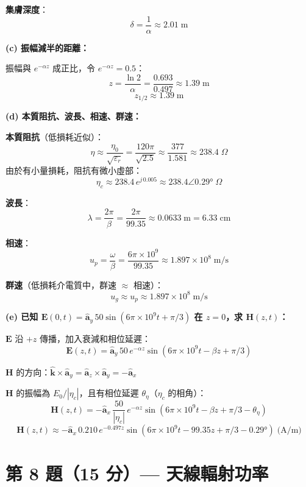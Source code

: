 \documentclass[12pt,a4paper]{article}
\newcommand{\vE}{\mathbf{E}}
\newcommand{\vH}{\mathbf{H}}
\newcommand{\vk}{\mathbf{k}}
\newcommand{\ax}{\hat{\mathbf{a}}_x}
\newcommand{\ay}{\hat{\mathbf{a}}_y}
\newcommand{\az}{\hat{\mathbf{a}}_z}
\begin{document}
\begin{solutionbox}[詳解]
\textbf{集膚深度}：
\[
  \boxed{\delta = \frac{1}{\alpha} \approx 2.01 \;\text{m}}
\]

\textbf{(c) 振幅減半的距離：}

振幅與 $e^{-\alpha z}$ 成正比，令 $e^{-\alpha z} = 0.5$：
\[
  z = \frac{\ln 2}{\alpha} = \frac{0.693}{0.497} \approx 1.39 \;\text{m}
\]
\[
  \boxed{z_{1/2} \approx 1.39 \;\text{m}}
\]

\textbf{(d) 本質阻抗、波長、相速、群速：}

\textbf{本質阻抗}（低損耗近似）：
\[
  \eta \approx \frac{\eta_0}{\sqrt{\varepsilon_r}} = \frac{120\pi}{\sqrt{2.5}} \approx \frac{377}{1.581} \approx 238.4\;\Omega
\]
由於有小量損耗，阻抗有微小虛部：
\[
  \boxed{\eta_c \approx 238.4\,e^{j\,0.005} \approx 238.4\angle 0.29° \;\Omega}
\]

\textbf{波長}：
\[
  \boxed{\lambda = \frac{2\pi}{\beta} = \frac{2\pi}{99.35} \approx 0.0633 \;\text{m} = 6.33\;\text{cm}}
\]

\textbf{相速}：
\[
  \boxed{u_p = \frac{\omega}{\beta} = \frac{6\pi\times10^9}{99.35} \approx 1.897\times10^8 \;\text{m/s}}
\]

\textbf{群速}（低損耗介電質中，群速 $\approx$ 相速）：
\[
  \boxed{u_g \approx u_p \approx 1.897\times10^8 \;\text{m/s}}
\]

\textbf{(e) 已知 $\vE(0,t) = \ay\,50\sin(6\pi\times10^9 t + \pi/3)$ 在 $z=0$，求 $\vH(z,t)$：}

$\vE$ 沿 $+z$ 傳播，加入衰減和相位延遲：
\[
  \vE(z,t) = \ay\,50\,e^{-\alpha z}\sin(6\pi\times10^9 t - \beta z + \pi/3)
\]

$\vH$ 的方向：$\hat{\vk} \times \ay = \az \times \ay = -\ax$

$\vH$ 的振幅為 $E_0/|\eta_c|$，且有相位延遲 $\theta_\eta$（$\eta_c$ 的相角）：
\[
  \vH(z,t) = -\ax\,\frac{50}{|\eta_c|}\,e^{-\alpha z}\sin(6\pi\times10^9 t - \beta z + \pi/3 - \theta_\eta)
\]
\[
  \boxed{\vH(z,t) \approx -\ax\,0.210\,e^{-0.497z}\sin(6\pi\times10^9 t - 99.35z + \pi/3 - 0.29°) \;\text{(A/m)}}
\]
\end{solutionbox}

\section{第 8 題（15 分）— 天線輻射功率}
\end{document}
